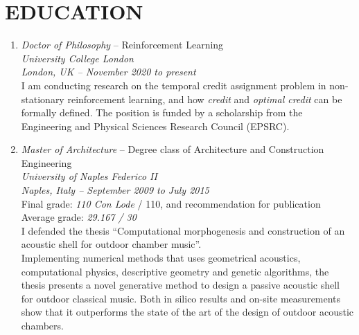 \section*{EDUCATION}
    \begin{enumerate}[leftmargin=0.45cm, itemsep=1em, topsep=0.5em, parsep=0.2em]
        \item
        \emph{Doctor of Philosophy} -- Reinforcement Learning \\
        \emph{University College London} \\
        \textit{London, UK -- November 2020 to \emph{present}}  \vspace{0.2em} \\
        {I am conducting research on the temporal credit assignment problem in non-stationary reinforcement learning, and how \textit{credit} and \textit{optimal credit} can be formally defined. The position is funded by a scholarship from the Engineering and Physical Sciences Research Council (EPSRC).}
        \item
        \emph{Master of Architecture} -- Degree class of Architecture and Construction Engineering \\
        \emph{University of Naples Federico II} \\
        \textit{Naples, Italy -- September 2009 to July 2015} \\
        Final grade: \emph{110 Con Lode} / 110, and recommendation for publication \\
        Average grade: \emph{29.167 / 30}  \vspace{0.2em} \\
        {I defended the thesis “Computational morphogenesis and construction of an acoustic shell for outdoor chamber music”. \\Implementing numerical methods that uses geometrical acoustics, computational physics, descriptive geometry and genetic algorithms, the thesis presents a novel generative method to design a passive acoustic shell for outdoor classical music. Both in silico results and on-site measurements show that it outperforms the state of the art of the design of outdoor acoustic chambers.}
    \end{enumerate}
